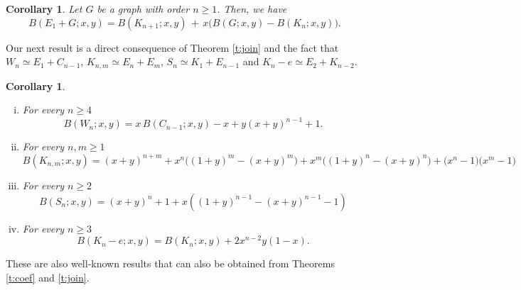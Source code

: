 \documentclass[review]{elsarticle}
\newtheorem{corollary}[theorem]{Corollary}
\begin{document}
\medskip

\begin{corollary}\label{c:E+G}
 Let $G$ be a graph with order $n\ge1$. Then, we have 
 \[%
 B(E_1+G;x,y) = B(K_{n+1};x,y) \,+\, x \Big(B(G;x,y)-B(K_{n};x,y)\Big).
 \]%
\end{corollary}

Our next result is a direct consequence of Theorem \ref{t:join} and the fact that $W_{n}\simeq E_1 + C_{n-1}$, $K_{n,m}\simeq E_n + E_m$, $S_{n}\simeq K_1 + E_{n-1}$ and $K_{n}-e\simeq E_2 + K_{n-2}$.

\begin{corollary}\label{p:join_samples} 
 {$\quad$}
 \begin{enumerate}[(i)]
   \item For every $n\ge4$ 
       \begin{equation}\label{eq:Wn}
         B(W_{n};x,y) = x\,B(C_{n-1};x,y)-x + y(x+y)^{n-1} + 1.
       \end{equation}

   \item For every $n,m\ge1$ 
       \begin{equation}\label{eq:k_nm}
         B(K_{n,m};x,y) = (x+y)^{n+m} + x^{n}\big((1+y)^{m}-(x+y)^{m}\big) + x^{m}\big((1+y)^{n}-(x+y)^{n}\big) + \big(x^n-1\big)\big(x^m-1\big)
       \end{equation}

   \item For every $n\ge2$
       \begin{equation}\label{eq:Sn}
         B(S_n;x,y) = (x+y)^{n} + 1 + x\left((1+y)^{n-1}-(x+y)^{n-1}-1\right)
       \end{equation}

   \item For every $n\ge3$
       \begin{equation}\label{eq:kn-e}
         B(K_n-e;x,y) = B(K_{n};x,y) + 2x^{n-2}y(1-x).
       \end{equation}
  \end{enumerate}
\end{corollary}

These are also well-known results that can also be obtained from Theorems \ref{t:coef} and \ref{t:join}. 
\end{document}
